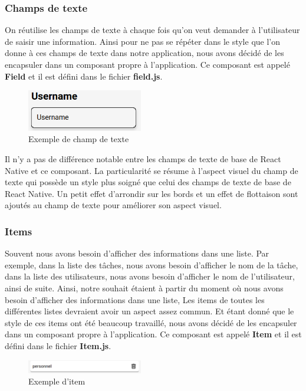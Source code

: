 \documentclass[12pt]{article}
\begin{document}
        \subsubsection{Champs de texte}\label{subsubsec:champs-de-texte}
        On réutilise les champs de texte à chaque fois qu'on veut demander à l'utilisateur de saisir une information.
        Ainsi pour ne pas se répéter dans le style que l'on donne à ces champs de texte dans notre application, nous avons
        décidé de les encapsuler dans un composant propre à l'application. Ce composant est appelé \textbf{Field}
        et il est défini dans le fichier \textbf{field.js}.\\
        \begin{figure}[H]
            \centering
            \includegraphics[width=0.45\textwidth]{images/field}
            \caption{Exemple de champ de texte}
            \label{fig:field}
        \end{figure}
        Il n'y a pas de différence notable entre les champs de texte de base de React Native et ce composant. La particularité
        se résume à l'aspect visuel du champ de texte qui possède un style plus soigné que celui des champs de texte de base de React Native.
        Un petit effet d'arrondir sur les bords et un effet de flottaison sont ajoutés au champ de texte pour améliorer son aspect visuel.

        \subsubsection{Items}\label{subsubsec:items}
        Souvent nous avons besoin d'afficher des informations dans une liste. Par exemple, dans la liste des tâches, nous avons besoin
        d'afficher le nom de la tâche, dans la liste des utilisateurs, nous avons besoin d'afficher le nom de l'utilisateur, ainsi
        de suite. Ainsi, notre souhait étaient à partir du moment où nous avons besoin d'afficher des informations dans une liste,
        Les items de toutes les différentes listes devraient avoir un aspect assez commun. Et étant donné que le style de ces items
        ont été beaucoup travaillé, nous avons décidé de les encapsuler dans un composant propre à l'application. Ce composant est appelé
        \textbf{Item} et il est défini dans le fichier \textbf{Item.js}.\\
        \begin{figure}[H]
            \centering
            \includegraphics[width=0.45\textwidth]{images/item}
            \caption{Exemple d'item}
            \label{fig:item}
        \end{figure}
\end{document}
